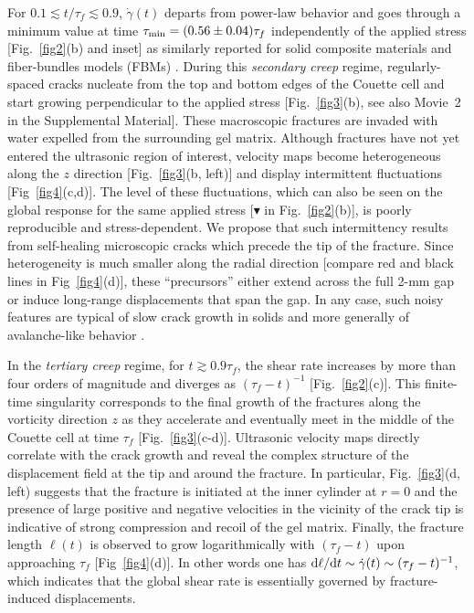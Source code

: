 \documentclass[twocolumn,superscriptaddress,showpacs,preprintnumbers,amsmath,amssymb,prl]{revtex4}
\newcommand\gp{\dot\gamma}
\begin{document}
For $0.1\lesssim t/\tau_f\lesssim 0.9$, $\gp(t)$ departs from power-law behavior and goes through a minimum value at time $\tau_{\rm min}= (0.56\pm0.04)\tau_f$ independently of the applied stress [Fig.~\ref{fig2}(b) and inset] as similarly reported for solid composite materials \cite{Nechad:2005} and fiber-bundles models (FBMs) \cite{Kovacs:2008,Jagla:2011}. During this {\it secondary creep} regime, regularly-spaced cracks nucleate from the top and bottom edges of the Couette cell and start growing perpendicular to the applied stress [Fig.~\ref{fig3}(b), see also Movie~2 in the Supplemental Material]. These macroscopic fractures are invaded with water expelled from the surrounding gel matrix. Although fractures have not yet entered the ultrasonic region of interest, velocity maps become heterogeneous along the $z$ direction [Fig.~\ref{fig3}(b, left)] and display intermittent fluctuations [Fig~\ref{fig4}(c,d)]. The level of these fluctuations, which can also be seen on the global response for the same applied stress [$\blacktriangledown$ in Fig.~\ref{fig2}(b)], is poorly reproducible and stress-dependent. We propose that such intermittency results from self-healing microscopic cracks which precede the tip of the fracture. Since heterogeneity is much smaller along the radial direction [compare red and black lines in Fig~\ref{fig4}(d)], these ``precursors'' either extend across the full 2-mm gap or induce long-range displacements that span the gap. In any case, such noisy features are typical of slow crack growth in solids \cite{Vanel:2009,Kun:2007} and more generally of avalanche-like behavior \cite{Sethna:2001}.

In the {\it tertiary creep} regime, for $t\gtrsim 0.9\tau_f$, the shear rate increases by more than four orders of magnitude and diverges as $(\tau_f-t)^{-1}$ [Fig.~\ref{fig2}(c)]. This finite-time singularity corresponds to the final growth of the fractures along the vorticity direction $z$ as they accelerate and eventually meet in the middle of the Couette cell at time $\tau_f$ [Fig.~\ref{fig3}(c-d)]. Ultrasonic velocity maps directly correlate with the crack growth and reveal the complex structure of the displacement field at the tip and around the fracture. In particular, Fig.~\ref{fig3}(d, left) suggests that the fracture is initiated at the inner cylinder at $r=0$ and the presence of large positive and negative velocities in the vicinity of the crack tip is indicative of strong compression and recoil of the gel matrix. Finally, the fracture length $\ell(t)$ is observed to grow logarithmically with $(\tau_f-t)$ upon approaching $\tau_f$ [Fig~\ref{fig4}(d)]. In other words one has ${\rm d}\ell/{\rm d}t\sim\gp(t)\sim (\tau_f-t)^{-1}$, which indicates that the global shear rate is essentially governed by fracture-induced displacements.
\end{document}
